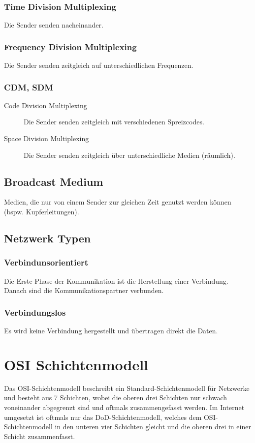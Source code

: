 		\subsection{Time Division Multiplexing}
			Die Sender senden nacheinander.

		\subsection{Frequency Division Multiplexing}
			Die Sender senden zeitgleich auf unterschiedlichen Frequenzen.

		\subsection{CDM, SDM}
			\begin{description}
				\item[Code Division Multiplexing] Die Sender senden zeitgleich mit verschiedenen Spreizcodes.
				\item[Space Division Multiplexing] Die Sender senden zeitgleich über unterschiedliche Medien (räumlich).
			\end{description}

	\section{Broadcast Medium}
		Medien, die nur von einem Sender zur gleichen Zeit genutzt werden können (bspw. Kupferleitungen).

	\section{Netzwerk Typen}
		\subsection{Verbindunsorientiert}
			Die Erste Phase der Kommunikation ist die Herstellung einer Verbindung. Danach sind die Kommunikationspartner verbunden.

		\subsection{Verbindungslos}
			Es wird keine Verbindung hergestellt und übertragen direkt die Daten.

\chapter{OSI Schichtenmodell}
	Das OSI-Schichtenmodell beschreibt ein Standard-Schichtenmodell für Netzwerke und besteht aus 7 Schichten, wobei die oberen drei Schichten nur schwach voneinander abgegrenzt sind und oftmals zusammengefasst werden. Im Internet umgesetzt ist oftmals nur das DoD-Schichtenmodell, welches dem OSI-Schichtenmodell in den unteren vier Schichten gleicht und die oberen drei in einer Schicht zusammenfasst.

